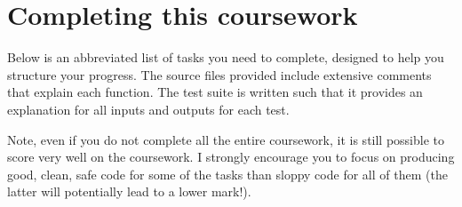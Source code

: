 \documentclass[a4paper]{article}
\begin{document}
%
%
%
%



\section*{Completing this coursework}\label{sec:tasks}

Below is an abbreviated list of tasks you need to complete, designed to help you structure your progress. The source files provided include extensive comments that explain each function. The test suite is written such that it provides an explanation for all inputs and outputs for each test.

Note, even if you do not complete all the entire coursework, it is still possible to score very well on the coursework. I strongly encourage you to focus on producing good, clean, safe code for some of the tasks than sloppy code for all of them (the latter will potentially lead to a lower mark!).
\end{document}
